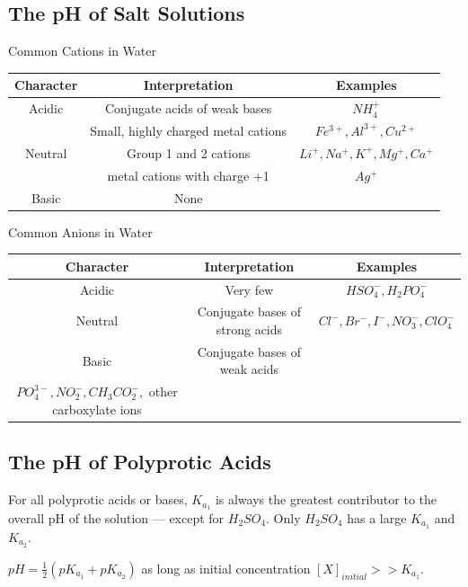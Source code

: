 \documentclass[a4paper,12pt]{article}
\begin{document}
\subsection{The pH of Salt Solutions}
\renewcommand\arraystretch{1.3}
\begin{center}
Common Cations in Water\par
  \begin{tabular}{ccc}
    \toprule
    Character & Interpretation & Examples \\
    \hline
    Acidic    & Conjugate acids of weak bases &$NH_{4}^{+}$ \\
    & Small, highly charged metal cations & $Fe^{3+}, Al^{3+}, Cu^{2+}$ \\
    \hline
    Neutral  & Group 1 and 2 cations & $Li^{+}, Na^{+}, K^{+}, Mg^{+}, Ca^{+}$\\
    & metal cations with charge +1& $Ag^{+}$ \\
    \hline
    Basic  & None&  \\
    \bottomrule
  \end{tabular}
  \end{center}
\begin{center}
Common Anions in Water\par  
  \begin{tabular}{ccc}
    \toprule
    Character & Interpretation & Examples \\
    \hline
    Acidic    & Very few &$HSO_{4}^{-}, H_{2}PO_{4}^{-}$ \\
    \hline
    Neutral  & Conjugate bases of strong acids &$Cl^{-}, Br^{-}, I^{-}, NO_{3}^{-}, ClO_{4}^{-}$ \\
    \hline
    Basic  & Conjugate bases of weak acids& \thead{$F^{-}, O^{2-}, OH^{-}, S^{2-}, HS^{-}, CN^{-}, CO_{3}^{2-},$\\ $PO_{4}^{3-}, NO_{2}^{-}, CH_{3}CO_{2}^{-},$ other carboxylate ions} \\
    \bottomrule
  \end{tabular}
\end{center}
\subsection{The pH of Polyprotic Acids}
For all polyprotic acids or bases, $K_{a_{1}}$ is always the greatest contributor to the overall pH of the solution — except for $H_{2}SO_{4}$.
Only $H_{2}SO_{4}$ has a large $K_{a_{1}}$ and $K_{a_{2}}$.\par
$pH = \frac{1}{2} (pK_{a_{1}} + pK_{a_{2}})$ as long as initial concentration $[X]_{initial} >> K_{a_{1}}$.
\end{document}
